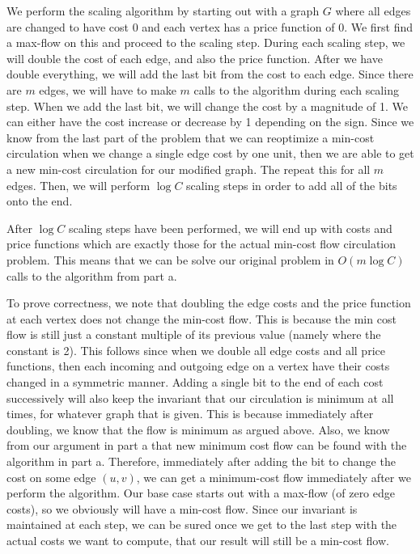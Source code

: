 \documentclass[psamsfonts]{amsart}
\newenvironment{sol}{\vspace{0.25cm}{\large \bfseries Solution:}}{\qedsymbol}
\begin{document}
\begin{sol}
We perform the scaling algorithm by starting out with a graph $G$ where all edges are changed to have cost $0$ and each vertex has a price function of $0$. We first find a max-flow on this and proceed to the scaling step. During each scaling step, we will double the cost of each edge, and also the price function. After we have double everything, we will add the last bit from the cost to each edge. Since there are $m$ edges, we will have to make $m$ calls to the algorithm during each scaling step. When we add the last bit, we will change the cost by a magnitude of 1. We can either have the cost increase or decrease by 1 depending on the sign. Since we know from the last part of the problem that we can reoptimize a min-cost circulation when we change a single edge cost by one unit, then we are able to get a new min-cost circulation for our modified graph. The repeat this for all $m$ edges. Then, we will perform $\log C$ scaling steps in order to add all of the bits onto the end.

After $\log C$ scaling steps have been performed, we will end up with costs and price functions which are exactly those for the actual min-cost flow circulation problem. This means that we can be solve our original problem in $O(m \log C)$ calls to the algorithm from part a.

To prove correctness, we note that doubling the edge costs and the price function at each vertex does not change the min-cost flow. This is because the min cost flow is still just a constant multiple of its previous value (namely where the constant is 2). This follows since when we double all edge costs and all price functions, then each incoming and outgoing edge on a vertex have their costs changed in a symmetric manner. Adding a single bit to the end of each cost successively will also keep the invariant that our circulation is minimum at all times, for whatever graph that is given. This is because immediately after doubling, we know that the flow is minimum as argued above. Also, we know from our argument in part a that new minimum cost flow can be found with the algorithm in part a. Therefore, immediately after adding the bit to change the cost on some edge $(u,v)$, we can get a minimum-cost flow immediately after we perform the algorithm. Our base case starts out with a max-flow (of zero edge costs), so we obviously will have a min-cost flow. Since our invariant is maintained at each step, we can be sured once we get to the last step with the actual costs we want to compute, that our result will still be a min-cost flow.  
\end{sol}
\end{document}
